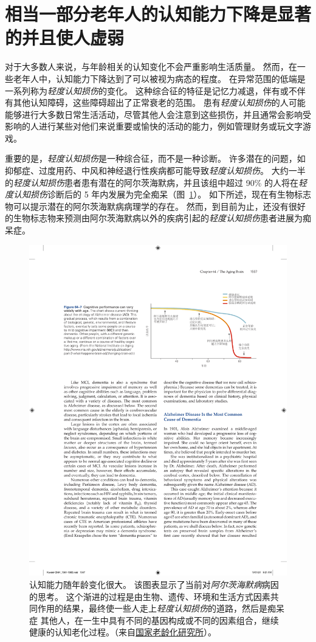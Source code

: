 \section{相当一部分老年人的认知能力下降是显著的并且使人虚弱}

对于大多数人来说，与年龄相关的认知变化不会严重影响生活质量。
然而，在一些老年人中，认知能力下降达到了可以被视为病态的程度。
在异常范围的低端是一系列称为\textit{轻度认知损伤}的变化。
这种综合征的特征是记忆力减退，伴有或不伴有其他认知障碍，这些障碍超出了正常衰老的范围。
患有\textit{轻度认知损伤}的人可能能够进行大多数日常生活活动，尽管其他人会注意到这些损伤，并且通常会影响受影响的人进行某些对他们来说重要或愉快的活动的能力，例如管理财务或玩文字游戏。


重要的是，\textit{轻度认知损伤}是一种综合征，而不是一种诊断。
许多潜在的问题，如抑郁症、过度用药、中风和神经退行性疾病都可能导致\textit{轻度认知损伤}。
大约一半的\textit{轻度认知损伤}患者患有潜在的阿尔茨海默病，并且该组中超过 90\% 的人将在\textit{轻度认知损伤}诊断后的 5 年内发展为完全痴呆（图~\ref{fig:64_7}）。
如下所述，现在有生物标志物可以提示潜在的阿尔茨海默病病理学的存在。
然而，到目前为止，还没有很好的生物标志物来预测由阿尔茨海默病以外的疾病引起的\textit{轻度认知损伤}患者进展为痴呆症。


\begin{figure}[htbp]
	\centering
	\includegraphics[width=0.86\linewidth]{chap64/fig_64_7}
	\caption{认知能力随年龄变化很大。
		该图表显示了当前对\textit{阿尔茨海默病}病因的思考。
		这个渐进的过程是由生物、遗传、环境和生活方式因素共同作用的结果，最终使一些人走上\textit{轻度认知损伤}的道路，然后是痴呆症
		其他人，在一生中具有不同的基因构成或不同的因素组合，继续健康的认知老化过程。（来自\href{http://www.nia.nih.gov/alzheimers/publication/part-2-what-happens-brain-ad/changing-brain-ad}{国家老龄化研究所}）。}
	\label{fig:64_7}
\end{figure}


